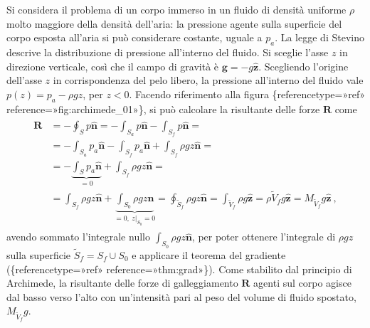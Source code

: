 \documentclass[letterpaper,10pt,italian]{jupyterBook}
\begin{document}
\sphinxAtStartPar
Si considera il problema di un corpo immerso in un fluido di densità
uniforme \(\rho\) molto maggiore della densità dell’aria: la pressione
agente sulla superficie del corpo esposta all’aria si può considerare
costante, uguale a \(p_a\). La legge di Stevino descrive la distribuzione
di pressione all’interno del fluido. Si sceglie l’asse \(z\) in direzione
verticale, così che il campo di gravità è \(\mathbf{g} = -g \mathbf{\hat{z}}\).
Scegliendo l’origine dell’asse \(z\) in corrispondenza del pelo libero, la
pressione all’interno del fluido vale \(p(z) = p_a - \rho g z\), per
\(z < 0\). Facendo riferimento alla figura
\{reference\sphinxhyphen{}type=»ref»
reference=»fig:archimede\_01»\}, si può calcolare la risultante delle
forze \(\mathbf{R}\) come
\begin{equation*}
\begin{split}\begin{aligned}
    \mathbf{R} & = - \oint_{S} p \mathbf{\hat{n}} = 
               - \int_{S_a} p \mathbf{\hat{n}} - \int_{S_f} p \mathbf{\hat{n}} = \\
        & =    - \int_{S_a} p_a \mathbf{\hat{n}} - \int_{S_f} p_a \mathbf{\hat{n}} + 
                 \int_{S_f} \rho g z \mathbf{\hat{n}} = \\
        & =    - \underbrace{\int_{S} p_a \mathbf{\hat{n}}}_{=0} + 
                 \int_{S_f} \rho g z \mathbf{\hat{n}} = \\
        & =      \int_{S_f} \rho g z \mathbf{\hat{n}} + 
                 \underbrace{\int_{S_0} \rho g z \mathbf{\hat{n}}}_{=0, \ z|_{S_0} = 0} =
                 \oint_{\tilde{S}_f} \rho g z \mathbf{\hat{n}} = 
                 \int_{\tilde{V}_f} \rho g \mathbf{\hat{z} } = 
                 \rho \tilde{V}_f g \mathbf{\hat{z}} = 
                 M_{\tilde{V}_f} g \mathbf{\hat{z}} \ ,
\end{aligned}\end{split}
\end{equation*}
\sphinxAtStartPar
avendo sommato l’integrale nullo
\(\int_{S_0} \rho g z \mathbf{\hat{n}}\), per poter ottenere l’integrale di
\(\rho g z\) sulla superficie \(\tilde{S}_f = S_f \cup S_0\) e applicare il
teorema del gradiente (\{reference\sphinxhyphen{}type=»ref»
reference=»thm:grad»\}). Come stabilito dal principio di Archimede, la
risultante delle forze di galleggiamento \(\mathbf{R}\) agenti sul corpo
agisce dal basso verso l’alto con un’intensità pari al peso del volume
di fluido spostato, \(M_{\tilde{V}_f} g\).
\end{document}
